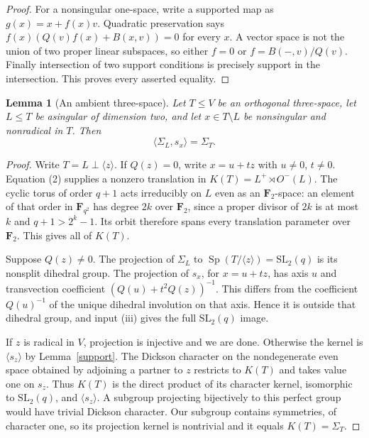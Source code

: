 \documentclass[11pt,a4paper]{article}
\newtheorem{lemma}[theorem]{Lemma}
\newcommand{\gen}[1]{\langle#1\rangle}
\newcommand{\F}{\mathbf F}
\newcommand{\Sp}{\operatorname{Sp}}
\begin{document}
\begin{proof}
For a nonsingular one-space, write a supported map as
$g(x)=x+f(x)v$. Quadratic preservation says
$f(x)(Q(v)f(x)+B(x,v))=0$ for every $x$.
A vector space is not the union of two proper linear subspaces,
so either $f=0$ or $f=B(-,v)/Q(v)$.
Finally intersection of two support conditions is precisely support
in the intersection. This proves every asserted equality.
\end{proof}

\begin{lemma}[An ambient three-space]\label{three}
Let $T\leq V$ be an orthogonal three-space, let $L\leq T$
be asingular of dimension two, and let $x\in T\setminus L$
be nonsingular and nonradical in $T$. Then
\[
                    \gen{\Sigma_L,s_x}=\Sigma_T.
\]
\end{lemma}
\begin{proof}
Write $T=L\perp\gen z$. If $Q(z)=0$, write $x=u+tz$
with $u\ne0$, $t\ne0$. Equation (2) supplies a nonzero
translation in $K(T)=L^+\rtimes O^-(L)$.
The cyclic torus of order $q+1$ acts irreducibly on $L$ even
as an $\F_2$-space: an element of that order in $\F_{q^2}$
has degree $2k$ over $\F_2$, since a proper divisor of $2k$
is at most $k$ and $q+1>2^k-1$. Its orbit therefore spans
every translation parameter over $\F_2$. This gives all of $K(T)$.

Suppose $Q(z)\ne0$. The projection of $\Sigma_L$ to
$\Sp(T/\gen z)=\mathrm{SL}_2(q)$ is its nonsplit dihedral
group. The projection of $s_x$, for $x=u+tz$, has axis $u$
and transvection coefficient $(Q(u)+t^2Q(z))^{-1}$.
This differs from the coefficient $Q(u)^{-1}$ of the unique
dihedral involution on that axis. Hence it is outside that dihedral
group, and input (iii) gives the full $\mathrm{SL}_2(q)$ image.

If $z$ is radical in $V$, projection is injective and we are done.
Otherwise the kernel is $\gen{s_z}$ by Lemma~\ref{support}.
The Dickson character on the nondegenerate even space obtained by
adjoining a partner to $z$ restricts to $K(T)$ and takes value one
on $s_z$. Thus $K(T)$ is the direct product of its character kernel,
isomorphic to $\mathrm{SL}_2(q)$, and $\gen{s_z}$.
A subgroup projecting bijectively to this perfect group would have
trivial Dickson character. Our subgroup contains symmetries, of
character one, so its projection kernel is nontrivial and it equals
$K(T)=\Sigma_T$.
\end{proof}
\end{document}
